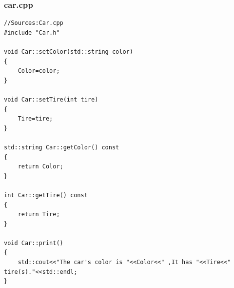 \documentclass[UTF8,18pt]{ctexart}
\begin{document}
\subsubsection{car.cpp}
\begin{verbatim}
//Sources:Car.cpp
#include "Car.h"

void Car::setColor(std::string color)
{
    Color=color;
}

void Car::setTire(int tire)
{
    Tire=tire;
}

std::string Car::getColor() const
{
    return Color;
}

int Car::getTire() const
{
    return Tire;
}

void Car::print()
{
    std::cout<<"The car's color is "<<Color<<" ,It has "<<Tire<<" tire(s)."<<std::endl;
}

\end{verbatim}
\end{document}
